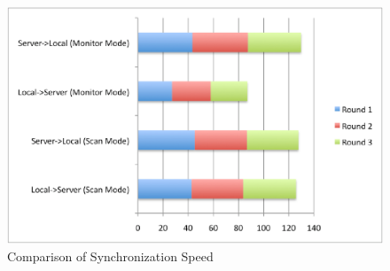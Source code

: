 \begin{figure}[htp]
\centering
\includegraphics[scale=0.5]{speed}
\caption{Comparison of Synchronization Speed}\label{fig:speed}
\end{figure}